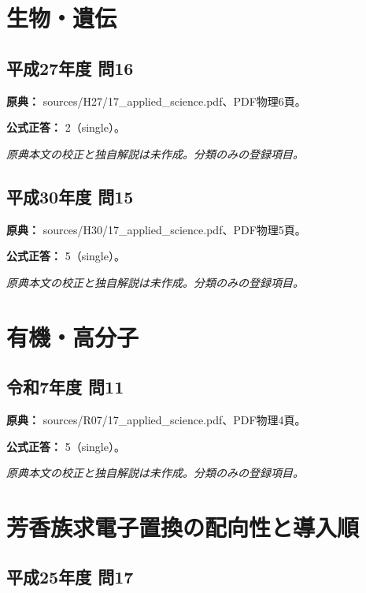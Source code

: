 \section{生物・遺伝}

\subsection{平成27年度 問16}
\label{q:h27-reg-applied-16}

\noindent\textbf{原典：} sources/H27/17\_applied\_science.pdf、PDF物理6頁。

\textbf{公式正答：} 2（single）。

\par\textit{原典本文の校正と独自解説は未作成。分類のみの登録項目。}

\subsection{平成30年度 問15}
\label{q:h30-reg-applied-15}

\noindent\textbf{原典：} sources/H30/17\_applied\_science.pdf、PDF物理5頁。

\textbf{公式正答：} 5（single）。

\par\textit{原典本文の校正と独自解説は未作成。分類のみの登録項目。}

\section{有機・高分子}

\subsection{令和7年度 問11}
\label{q:r07-reg-applied-11}

\noindent\textbf{原典：} sources/R07/17\_applied\_science.pdf、PDF物理4頁。

\textbf{公式正答：} 5（single）。

\par\textit{原典本文の校正と独自解説は未作成。分類のみの登録項目。}

\section{芳香族求電子置換の配向性と導入順}

\subsection{平成25年度 問17}
\label{q:h25-reg-applied-17}

